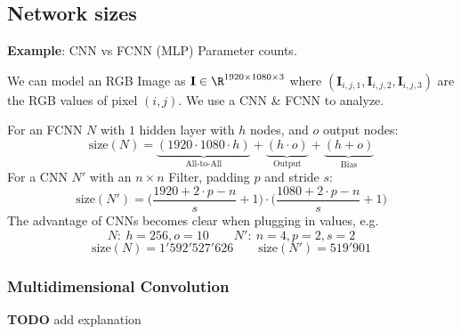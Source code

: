 \newpage

\subsection{Network sizes}



{\footnotesize
    \textbf{Example}: CNN vs FCNN (MLP) Parameter counts.

    We can model an RGB Image as $\mathbf{I}\in\R^{1920\times1080\times3}$ where
    $(\mathbf{I}_{i,j,1},\mathbf{I}_{i,j,2},\mathbf{I}_{i,j,3})$ are the RGB values of pixel $(i,j)$. We use a CNN \& FCNN to analyze.

    For an FCNN $N$ with $1$ hidden layer with $h$ nodes, and $o$ output nodes:
    $$
        \text{size}(N) = \underbrace{(1920 \cdot 1080 \cdot h)}_{\text{All-to-All}} + \underbrace{(h \cdot o)}_\text{Output} + \underbrace{(h + o)}_\text{Bias}
    $$
    For a CNN $N'$ with an $n\times n$ Filter, padding $p$ and stride $s$:
    $$
        \text{size}(N') = \biggl(\frac{1920 + 2\cdot p - n}{s}+1\biggr)\cdot\biggl(\frac{1080+2\cdot p - n}{s}+1\biggr)
    $$
    The advantage of CNNs becomes clear when plugging in values, e.g.
    $$
        N:\ h=256, o=10 \qquad N':\ n=4, p=2, s=2 
    $$
    $$
    \text{size}(N) = 1'592'527'626 \qquad \text{size}(N') = 519'901
    $$
}

\subsubsection{Multidimensional Convolution}
\textbf{TODO} add explanation

